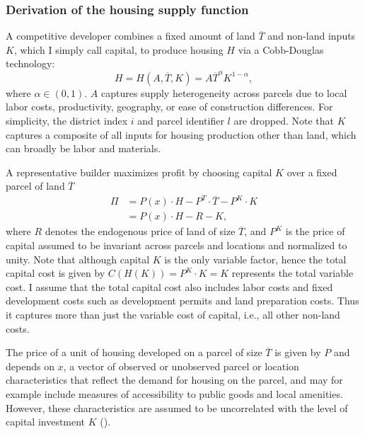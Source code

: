 \documentclass[
  12pt,
]{article}
\begin{document}
\renewcommand\thetable{\thesection.\arabic{table}}    
\setcounter{table}{0}

\subsubsection{Derivation of the housing supply function}\label{supplyapp}

A competitive developer combines a fixed amount of land \(\overline{T}\) and non-land inputs \(K\), which I simply call capital, to produce housing \(H\) via a Cobb-Douglas technology: \begin{equation}
  H = H(A, \overline{T}, K) = A \overline{T}^{\alpha} K^{1-\alpha}\label{eq:app-cobb},
\end{equation} where \(\alpha \in (0, 1)\). \(A\) captures supply heterogeneity across parcels due to local labor costs, productivity, geography, or ease of construction differences. For simplicity, the district index \(i\) and parcel identifier \(l\) are dropped. Note that \(K\) captures a composite of all inputs for housing production other than land, which can broadly be labor and materials.

A representative builder maximizes profit by choosing capital \(K\) over a fixed parcel of land \(\overline{T}\) \[\begin{aligned}
\Pi &= P(x) \cdot H - P^T \cdot \overline{T} - P^K\cdot K\\
&=P(x)\cdot H - R - K,
\end{aligned}\]where \(R\) denotes the endogenous price of land of size \(\overline{T}\), and \(P^K\) is the price of capital assumed to be invariant across parcels and locations and normalized to unity. Note that although capital \(K\) is the only variable factor, hence the total capital cost is given by \(C(H(K)) = P^K\cdot K = K\) represents the total variable cost. I assume that the total capital cost also includes labor costs and fixed development costs such as development permits and land preparation costs. Thus it captures more than just the variable cost of capital, i.e., all other non-land costs.

The price of a unit of housing developed on a parcel of size \(\overline{T}\) is given by \(P\) and depends on \(x\), a vector of observed or unobserved parcel or location characteristics that reflect the demand for housing on the parcel, and may for example include measures of accessibility to public goods and local amenities. However, these characteristics are assumed to be uncorrelated with the level of capital investment \(K\) ().
\end{document}

